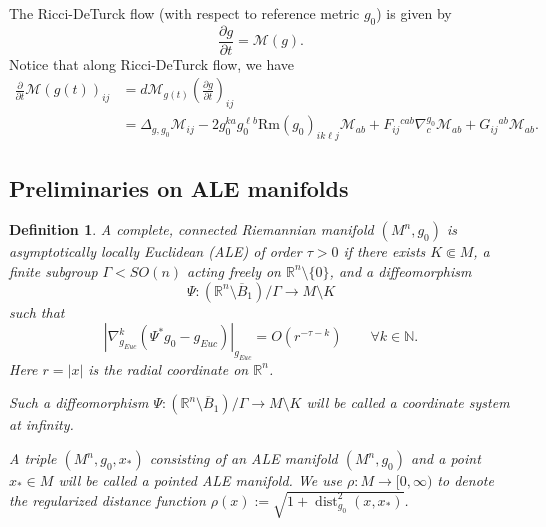 \documentclass[12pt]{amsart}
\newcommand{\calM}{\mathcal{M}}
\newcommand{\p}{{ \partial}}
\renewcommand{\1}{{\mathbf 1}}
\newcommand{\R}{{\mathbb R}}
\newcommand{\Rm}{\mathrm{Rm}}
\newcommand{\dist}{{\operatorname{dist}}}
\renewcommand{\p}{{\partial}}
\theoremstyle{others}
\newtheorem{defn}[thm]{Definition}
\numberwithin{equation}{section}
\begin{document}
The Ricci-DeTurck flow (with respect to reference metric $g_0$) is given by
\begin{equation} \label{eqn Ricci-DeTurck flow}
\frac{\partial g}{\partial t} = \calM(g).
\end{equation}
Notice that along Ricci-DeTurck flow, we have
\begin{equation}\label{Mevolution}
\begin{split}
    \frac{\p}{\p t } \mathcal{M}(g(t))_{ij} & = d \mathcal{M}_{g(t)} \left( \frac{\p  g}{\p t} \right)_{ij} \\
    & = \Delta_{g,g_0} \mathcal{M}_{ij} -2 g_0^{ka}g_0^{\ell b} \Rm(g_0)_{ik\ell j} \mathcal{M}_{ab} + F_{ij}{}^{cab} \nabla^{g_0}_c \mathcal{M}_{ab} + G_{ij}{}^{ab} \mathcal{M}_{ab}.
    \end{split}
\end{equation}



\vspace{2mm}




\subsection{Preliminaries on ALE manifolds}




\begin{defn} \label{defn: ALE}
    A complete, connected Riemannian manifold $(M^n, g_0)$ is \emph{asymptotically locally Euclidean (ALE) of order $\tau > 0$} if there exists $K \Subset M$, a finite subgroup $\Gamma < SO(n)$ acting freely on $\R^n \setminus \{ 0\}$, and a diffeomorphism 
        $$ \Psi : ( \R^n \setminus \overline B_1) / \Gamma  \to M  \setminus K $$
    such that
        $$| \nabla^k_{g_{Euc}} ( \Psi^* g_0 - g_{Euc} ) |_{g_{Euc}} = O ( r^{-\tau - k} ) \qquad \forall k \in \mathbb N.$$
    Here $r = |x|$ is the radial coordinate on $\R^n$.
        
    Such a diffeomorphism $\Psi : (\R^n \setminus \overline B_1)/ \Gamma \to M \setminus K $ will be called a \emph{coordinate system at infinity}.

    A triple $(M^n, g_0, x_*)$ consisting of an ALE manifold $(M^n, g_0)$ and a point $x_* \in M$ will be called a \emph{pointed ALE manifold}.
    We use $\rho : M \to [0, \infty)$ to denote the regularized distance function $\rho(x) := \sqrt { 1 + \dist_{g_0}^2 ( x, x_*)} $.
\end{defn}
\end{document}
